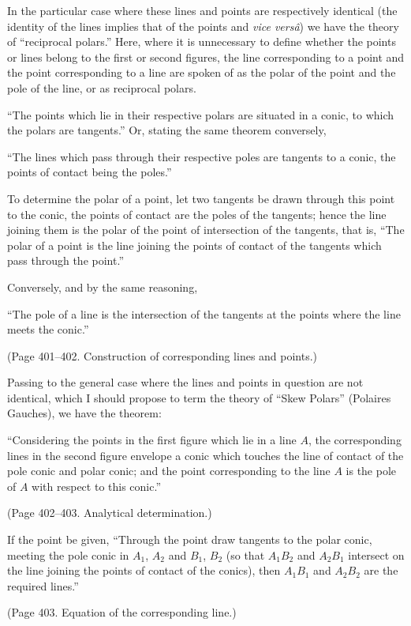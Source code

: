 \documentclass[11pt,a4paper]{book}
\begin{document}
In the particular case where these lines and points are respectively identical (the
identity of the lines implies that of the points and \textit{vice vers\^{a}}) we have the theory of
``reciprocal polars.'' Here, where it is unnecessary to define whether the points or
lines belong to the first or second figures, the line corresponding to a point and the
point corresponding to a line are spoken of as the polar of the point and the pole of
the line, or as reciprocal polars.

``The points which lie in their respective polars are situated in a conic, to which
the polars are tangents.'' Or, stating the same theorem conversely,

``The lines which pass through their respective poles are tangents to a conic, the
points of contact being the poles.''

To determine the polar of a point, let two tangents be drawn through this point to
the conic, the points of contact are the poles of the tangents; hence the line joining
them is the polar of the point of intersection of the tangents, that is, ``The polar of
a point is the line joining the points of contact of the tangents which pass through
the point.''

Conversely, and by the same reasoning,

``The pole of a line is the intersection of the tangents at the points where the
line meets the conic.''

(Page 401--402. Construction of corresponding lines and points.)

Passing to the general case where the lines and points in question are not identical,
which I should propose to term the theory of ``Skew Polars'' (Polaires Gauches), we
have the theorem:

``Considering the points in the first figure which lie in a line $A$, the corresponding
lines in the second figure envelope a conic which touches the line of contact of the
pole conic and polar conic; and the point corresponding to the line $A$ is the pole
of $A$ with respect to this conic.''

(Page 402--403. Analytical determination.)

If the point be given, ``Through the point draw tangents to the polar conic, meeting
the pole conic in $A_1$, $A_2$ and $B_1$, $B_2$ (so that $A_1B_2$ and $A_2B_1$ intersect on the line
joining the points of contact of the conics), then $A_1B_1$ and $A_2B_2$ are the required lines.''

(Page 403. Equation of the corresponding line.)
\end{document}

